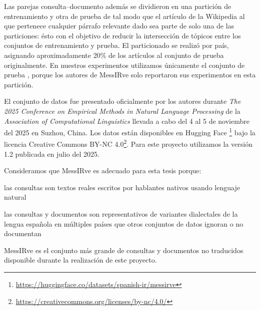 Las parejas consulta--documento además se dividieron en una partición de entrenamiento y otra de prueba de tal modo que el artículo de la Wikipedia al que pertenece cualquier párrafo relevante dado sea parte de solo una de las particiones: ésto con el objetivo de reducir la intersección de tópicos entre los conjuntos de entrenamiento y prueba. El particionado se realizó por país, asignando aproximadamente 20\% de los artículos al conjunto de prueba originalmente.
En nuestros experimentos utilizamos únicamente el conjunto de prueba , porque los autores de MessIRve solo reportaron sus experimentos en esta partición.

El conjunto de datos fue presentado oficialmente por los autores \textcite{messirve-ValentiniEtAl2025} durante \textit{The 2025 Conference on Empirical Methods in Natural Language Processing} de la \textit{Association of Computational Linguistics} llevada a cabo del 4 al 5 de noviembre del 2025 en Suzhou, China. Los datos están disponibles en Hugging Face \parencite{messirve-HuggingFace2025}\footnote{\url{https://huggingface.co/datasets/spanish-ir/messirve}} bajo la licencia Creative Commons BY-NC 4.0\footnote{\url{https://creativecommons.org/licenses/by-nc/4.0/}}. Para este proyecto utilizamos la versión 1.2 publicada en julio del 2025.

Consideramos que MessIRve es adecuado para esta tesis porque: \begin{enumerate*}[label=(\roman*)]
	\item las consultas son textos reales escritos por hablantes nativos usando lenguaje natural
	\item las consultas y documentos son representativos de variantes dialectales de la lengua española en múltiples países que otros conjuntos de datos ignoran o no documentan
	\item MessIRve es el conjunto más grande de consultas y documentos no traducidos disponible durante la realización de este proyecto.
\end{enumerate*}


